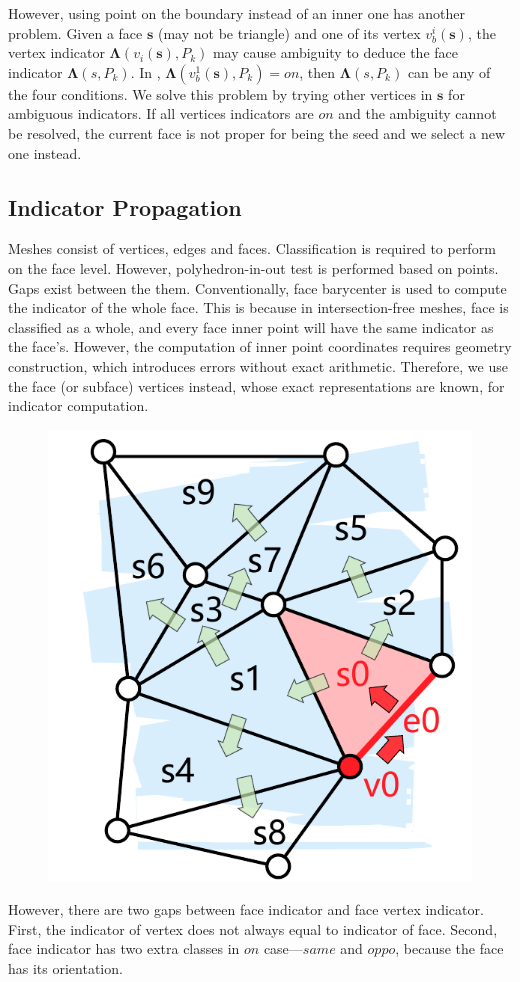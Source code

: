 \documentclass[10pt,journal,compsoc]{IEEEtran}
\begin{document}
However, using point on the boundary instead of an inner one has another problem. Given a face $\bm{s}$ (may not be triangle) and one of its vertex $v_b^i(\bm{s})$, the vertex indicator $\boldsymbol{\Lambda}(v_{i}(\bm{s}), P_k)$ may cause ambiguity to deduce the face indicator $\boldsymbol{\Lambda}(s, P_k)$. In {\color{red}{Fig. ?}}, $\boldsymbol{\Lambda}(v_b^1(\bm{s}), P_k) = on$, then $\boldsymbol{\Lambda}(s, P_k)$ can be any of the four conditions. We solve this problem by trying other vertices in $\bm{s}$ for ambiguous indicators. If all vertices indicators are $on$ and the ambiguity cannot be resolved, the current face is not proper for being the seed and we select a new one instead.

\fi

\subsection{Indicator Propagation}
\label{sec:propagation}


Meshes consist of vertices, edges and faces. Classification is required to perform on the face level. However, polyhedron-in-out test is performed based on points. Gaps exist between the them. Conventionally, face barycenter is used to compute the indicator of the whole face. This is because in intersection-free meshes, face is classified as a whole, and every face inner point will have the same indicator as the face's. However, the computation of inner point coordinates requires geometry construction, which introduces errors without exact arithmetic. Therefore, we use the face (or subface) vertices instead, whose exact representations are known, for indicator computation.

\begin{figure}
\includegraphics[width=1.3 in]{propagate}
\end{figure}

However, there are two gaps between face indicator and face vertex indicator. First, the indicator of vertex does not always equal to indicator of face. Second, face indicator has two extra classes in $on$ case---$same$ and $oppo$, because the face has its orientation.
\end{document}
